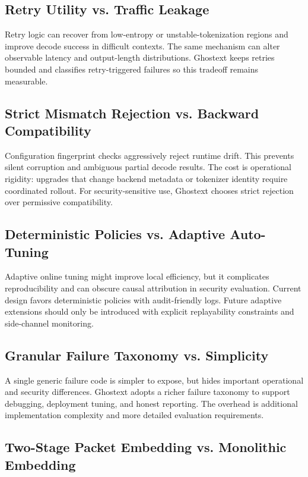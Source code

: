 \subsection{Retry Utility vs. Traffic Leakage}

Retry logic can recover from low-entropy or unstable-tokenization regions and improve decode success in difficult contexts. The same mechanism can alter observable latency and output-length distributions. Ghostext keeps retries bounded and classifies retry-triggered failures so this tradeoff remains measurable.

\subsection{Strict Mismatch Rejection vs. Backward Compatibility}

Configuration fingerprint checks aggressively reject runtime drift. This prevents silent corruption and ambiguous partial decode results. The cost is operational rigidity: upgrades that change backend metadata or tokenizer identity require coordinated rollout. For security-sensitive use, Ghostext chooses strict rejection over permissive compatibility.

\subsection{Deterministic Policies vs. Adaptive Auto-Tuning}

Adaptive online tuning might improve local efficiency, but it complicates reproducibility and can obscure causal attribution in security evaluation. Current design favors deterministic policies with audit-friendly logs. Future adaptive extensions should only be introduced with explicit replayability constraints and side-channel monitoring.

\subsection{Granular Failure Taxonomy vs. Simplicity}

A single generic failure code is simpler to expose, but hides important operational and security differences. Ghostext adopts a richer failure taxonomy to support debugging, deployment tuning, and honest reporting. The overhead is additional implementation complexity and more detailed evaluation requirements.

\subsection{Two-Stage Packet Embedding vs. Monolithic Embedding}

